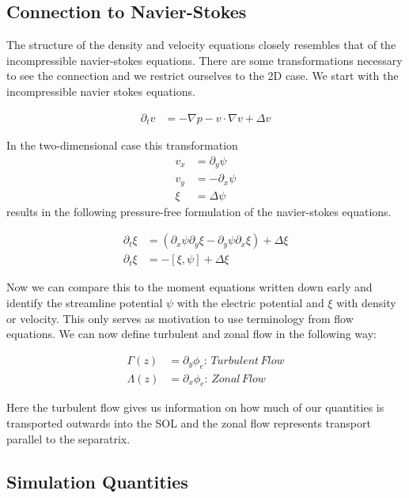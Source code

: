 \documentclass[master.tex]{subfiles}
\begin{document}
\subsection{Connection to Navier-Stokes}
\label{sec:connection_navier_stokes}

The structure of the density and velocity equations closely resembles that of the incompressible navier-stokes equations.
There are some transformations necessary to see the connection and we restrict ourselves to the 2D case. We start with the incompressible navier stokes equations.

\begin{align}
    \partial_t v &= - \nabla p - v \cdot \nabla v + \Delta v
\end{align}

In the two-dimensional case this transformation
\begin{align}
    v_x &= \partial_y \psi \\
    v_y &= -\partial_x \psi \\
    \xi &= \Delta \psi
\end{align}
results in the following pressure-free formulation of the navier-stokes equations.

\begin{align}
    \partial_t \xi &= \left( \partial_x \psi \partial_y \xi - \partial_y \psi \partial_x \xi  \right) + \Delta \xi\\
    \partial_t \xi &= - \left[\xi, \psi\right] + \Delta \xi
\end{align}

Now we can compare this to the moment equations written down early and identify the streamline potential $\psi$ with the electric potential and $\xi$ with density or velocity. This only serves as motivation to use terminology from flow equations. We can now define turbulent and zonal flow in the following way:

\begin{align}
    \Gamma(z) &= \partial_y \phi_e :\, Turbulent\,Flow\\
    \Lambda(z) &= \partial_x \phi_e :\, Zonal\,Flow
\end{align}

Here the turbulent flow gives us information on how much of our quantities is transported outwards into the SOL and the zonal flow represents transport parallel to the separatrix.

\subsection{Simulation Quantities}\label{sec:simulation_quantities}
\end{document}
